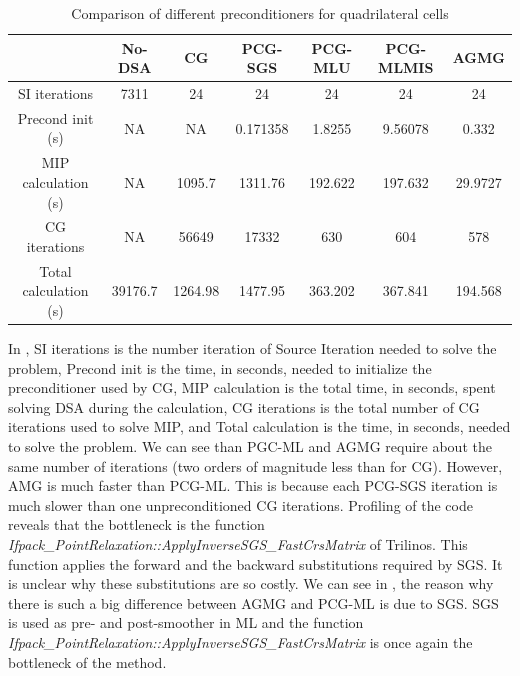 %
\begin{table}[H]
  \begin{center}
    \caption{Comparison of different preconditioners for quadrilateral cells}
    \begin{tabular}{|c|c|c|c|c|c|c|}
      \hline
      & No-DSA & CG & PCG-SGS & PCG-MLU & PCG-MLMIS & AGMG \\
      \hline
      SI iterations   & 7311    & 24      & 24       & 24      & 24      & 24 \\
   Precond init (s)   & NA      & NA      & 0.171358 & 1.8255  & 9.56078 & 0.332 \\
MIP calculation (s)   & NA      & 1095.7  & 1311.76  & 192.622 & 197.632 & 29.9727 \\
      CG iterations   & NA      & 56649   & 17332    & 630     & 604     & 578 \\
Total calculation (s) & 39176.7 & 1264.98 & 1477.95  & 363.202 & 367.841 &
      194.568 \\
      \hline
    \end{tabular}
    \label{comparison_homog_quad}
  \end{center}
\end{table}
In , SI iterations is the number iteration of 
Source Iteration needed to solve the problem, Precond init is the time, in
seconds, needed to initialize the preconditioner used by CG, MIP calculation
is the total time, in seconds, spent solving DSA during the calculation, CG
iterations is the total number of CG iterations used to solve MIP, and Total
calculation is the time, in seconds, needed to solve the problem. We can see
than PGC-ML and AGMG require about the same number of iterations (two orders
of magnitude less than for CG). However, AMG is much faster than PCG-ML. This 
is because each PCG-SGS iteration is much slower than one
unpreconditioned CG iterations. Profiling of the code reveals that the
bottleneck is the function 
\emph{Ifpack\_PointRelaxation::ApplyInverseSGS\_FastCrsMatrix} of Trilinos. This
function applies the forward and the backward substitutions required by SGS.
It is unclear why these substitutions are so costly. We can see in
, the reason why there is such a big
difference between AGMG and PCG-ML is due to SGS. SGS is used as pre- and
post-smoother in ML and the function
\emph{Ifpack\_PointRelaxation::ApplyInverseSGS\_FastCrsMatrix} is once again the
bottleneck of the method.

